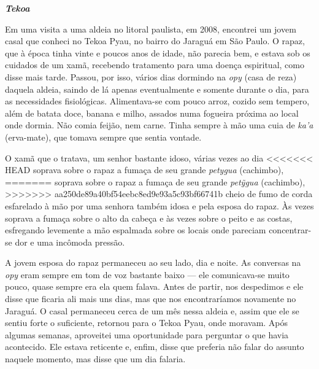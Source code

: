 \emph{\textbf{Tekoa}}

Em uma visita a uma aldeia no litoral paulista, em 2008, encontrei um
jovem casal que conheci no Tekoa Pyau, no bairro do Jaraguá em São
Paulo. O rapaz, que à época tinha vinte e poucos anos de idade, não
parecia bem, e estava sob os cuidados de um xamã, recebendo tratamento
para uma doença espiritual, como disse mais tarde. Passou, por isso,
vários dias dormindo na \emph{opy} (casa de reza) daquela aldeia, saindo de lá
apenas eventualmente e somente durante o dia, para as necessidades
fisiológicas. Alimentava-se com pouco arroz, cozido sem tempero, além
de batata doce, banana e milho, assados numa fogueira próxima ao local
onde dormia. Não comia feijão, nem carne. Tinha sempre à mão uma cuia
de \emph{ka’a} (erva-mate), que tomava sempre que sentia vontade. 

O xamã que o tratava, um senhor bastante idoso, várias vezes ao dia
<<<<<<< HEAD
soprava sobre o rapaz a fumaça de seu grande \emph{petygua} (cachimbo),
=======
soprava sobre o rapaz a fumaça de seu grande \emph{pet\~{y}gua} (cachimbo),
>>>>>>> aa250de89a40bf54eebc8ed9e93a5c93bf66741b
cheio de fumo de corda esfarelado à mão por uma senhora também idosa e
pela esposa do rapaz. Às vezes soprava a fumaça sobre o alto da cabeça
e às vezes sobre o peito e as costas, esfregando levemente a mão
espalmada sobre os locais onde pareciam concentrar-se dor e uma
incômoda pressão.

A jovem esposa do rapaz permaneceu ao seu lado, dia e noite. As
conversas na \emph{opy} eram sempre em tom de voz bastante baixo --- ele
comunicava-se muito pouco, quase sempre era ela quem falava. Antes de
partir, nos despedimos e ele disse que ficaria ali mais uns dias, mas
que nos encontraríamos novamente no Jaraguá. O casal permaneceu cerca
de um mês nessa aldeia e, assim que ele se sentiu forte o suficiente,
retornou para o Tekoa Pyau, onde moravam. Após algumas semanas,
aproveitei uma oportunidade para perguntar o que havia acontecido. Ele
estava reticente e, enfim, disse que preferia não falar do assunto
naquele momento, mas disse que um dia falaria.

